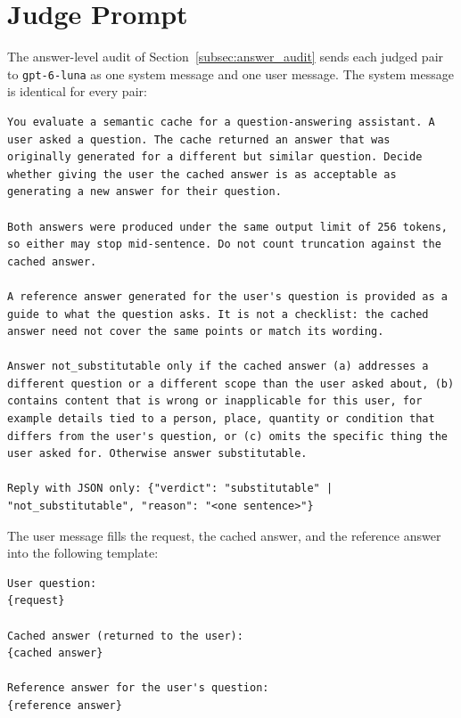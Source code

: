 \documentclass[authoryear,preprint,review,12pt]{elsarticle}
\begin{document}
\section{Judge Prompt}
\label{app:judge_prompt}
The answer-level audit of Section~\ref{subsec:answer_audit} sends each judged pair to \texttt{gpt-6-luna} as one system message and one user message. The system message is identical for every pair:
\begin{lstlisting}[basicstyle=\linespread{1.1}\footnotesize\ttfamily, columns=fullflexible, breaklines=true, breakatwhitespace=true, breakindent=0pt, frame=single, framesep=4pt, xleftmargin=4pt, xrightmargin=4pt]
You evaluate a semantic cache for a question-answering assistant. A user asked a question. The cache returned an answer that was originally generated for a different but similar question. Decide whether giving the user the cached answer is as acceptable as generating a new answer for their question.

Both answers were produced under the same output limit of 256 tokens, so either may stop mid-sentence. Do not count truncation against the cached answer.

A reference answer generated for the user's question is provided as a guide to what the question asks. It is not a checklist: the cached answer need not cover the same points or match its wording.

Answer not_substitutable only if the cached answer (a) addresses a different question or a different scope than the user asked about, (b) contains content that is wrong or inapplicable for this user, for example details tied to a person, place, quantity or condition that differs from the user's question, or (c) omits the specific thing the user asked for. Otherwise answer substitutable.

Reply with JSON only: {"verdict": "substitutable" | "not_substitutable", "reason": "<one sentence>"}
\end{lstlisting}
The user message fills the request, the cached answer, and the reference answer into the following template:
\par\noindent\begin{minipage}{\linewidth}
\begin{lstlisting}[basicstyle=\linespread{1.1}\footnotesize\ttfamily, columns=fullflexible, breaklines=true, breakatwhitespace=true, breakindent=0pt, frame=single, framesep=4pt, xleftmargin=4pt, xrightmargin=4pt]
User question:
{request}

Cached answer (returned to the user):
{cached answer}

Reference answer for the user's question:
{reference answer}
\end{lstlisting}
\end{minipage}

% 
\renewcommand{\bibfont}{\small}


\end{document}
